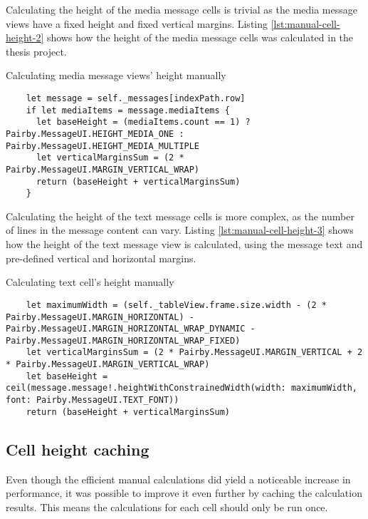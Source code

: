 \documentclass[a4paper,12pt]{article}
\begin{document}
Calculating the height of the media message cells is trivial as the media message views have a fixed height and fixed vertical margins. Listing \autoref{lst:manual-cell-height-2} shows how the height of the media message cells was calculated in the thesis project.
\begin{listing}[H]
  \caption{Calculating media message views' height manually}
  \label{lst:manual-cell-height-2}
  \begin{verbatim}
    let message = self._messages[indexPath.row]
    if let mediaItems = message.mediaItems {
      let baseHeight = (mediaItems.count == 1) ? Pairby.MessageUI.HEIGHT_MEDIA_ONE : Pairby.MessageUI.HEIGHT_MEDIA_MULTIPLE
      let verticalMarginsSum = (2 * Pairby.MessageUI.MARGIN_VERTICAL_WRAP)
      return (baseHeight + verticalMarginsSum)
    }
  \end{verbatim}
\end{listing}

Calculating the height of the text message cells is more complex, as the number of lines in the message content can vary. Listing \autoref{lst:manual-cell-height-3} shows how the height of the text message view is calculated, using the message text and pre-defined vertical and horizontal margins.
\begin{listing}[H]
  \caption{Calculating text cell's height manually}
  \label{lst:manual-cell-height-3}
  \begin{verbatim}
    let maximumWidth = (self._tableView.frame.size.width - (2 * Pairby.MessageUI.MARGIN_HORIZONTAL) - Pairby.MessageUI.MARGIN_HORIZONTAL_WRAP_DYNAMIC - Pairby.MessageUI.MARGIN_HORIZONTAL_WRAP_FIXED)
    let verticalMarginsSum = (2 * Pairby.MessageUI.MARGIN_VERTICAL + 2 * Pairby.MessageUI.MARGIN_VERTICAL_WRAP)
    let baseHeight = ceil(message.message!.heightWithConstrainedWidth(width: maximumWidth, font: Pairby.MessageUI.TEXT_FONT))
    return (baseHeight + verticalMarginsSum)
  \end{verbatim}
\end{listing}

\subsection{Cell height caching}
Even though the efficient manual calculations did yield a noticeable increase in performance, it was possible to improve it even further by caching the calculation results. This means the calculations for each cell should only be run once.
\end{document}
